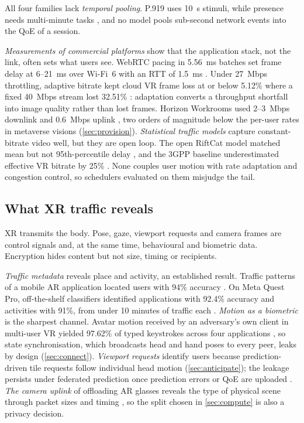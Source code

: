 All four families lack \emph{temporal pooling}. P.919 uses 10~s stimuli, while presence needs
multi-minute tasks \cite{W4284879755}, and no model pools sub-second network events into the QoE of a
session.

\emph{Measurements of commercial platforms} show that the application stack, not the link, often sets what users see. WebRTC pacing in 5.56~ms batches set frame
delay at 6--21~ms over Wi-Fi~6 with an RTT of 1.5~ms \cite{W4391506055}. Under 27~Mbps throttling,
adaptive bitrate kept cloud VR frame loss at or below 5.12\% where a fixed 40~Mbps stream lost 32.51\%
\cite{W4210470894}: adaptation converts a throughput shortfall into image quality rather than lost frames.
Horizon Workrooms used 2--3~Mbps downlink and 0.6~Mbps uplink \cite{W4294643390}, two orders of magnitude
below the per-user rates in metaverse visions (\cref{sec:provision}). \emph{Statistical traffic models}
capture constant-bitrate video well, but they are open loop. The open RiftCat model matched mean but not
95th-percentile delay \cite{W3192844644}, and the 3GPP baseline underestimated effective VR bitrate by
25\% \cite{W4399340506}. None couples user motion with rate adaptation and congestion control, so
schedulers evaluated on them misjudge the tail.

\subsection{What XR traffic reveals}
XR transmits the body. Pose, gaze, viewport requests and camera frames are control signals and, at the
same time, behavioural and biometric data. Encryption hides content but not size, timing or
recipients.

\emph{Traffic metadata} reveals place and activity, an established result.
Traffic patterns of a mobile AR application located users with 94\% accuracy \cite{W2946752973}. On Meta
Quest Pro, off-the-shelf classifiers identified applications with 92.4\% accuracy and activities with
91\%, from under 10 minutes of traffic each \cite{W4406880464}. \emph{Motion as a
biometric} is the sharpest channel. Avatar motion received by an adversary's own client in multi-user VR
yielded 97.62\% of typed keystrokes across four applications \cite{W4398796475}, so state
synchronisation, which broadcasts head and hand poses to every peer, leaks by design
(\cref{sec:connect}). \emph{Viewport requests} identify users because prediction-driven tile requests
follow individual head motion (\cref{sec:anticipate}); the leakage persists under federated prediction
once prediction errors or QoE are uploaded \cite{W4223932369}. \emph{The camera uplink} of offloading AR
glasses reveals the type of physical scene through packet sizes and timing \cite{W7215028895}, so the
split chosen in \cref{sec:compute} is also a privacy decision.

